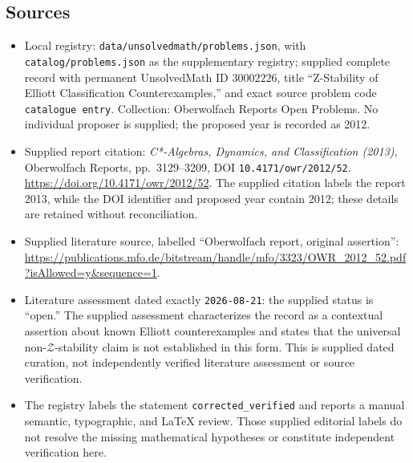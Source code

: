 \documentclass[11pt]{article}
\begin{document}
\subsection{Sources}
\begin{itemize}
\item Local registry: \texttt{data/unsolvedmath/problems.json}, with \texttt{catalog/problems.json} as the supplementary registry; supplied complete record with permanent UnsolvedMath ID \(30002226\), title ``Z-Stability of Elliott Classification Counterexamples,'' and exact source problem code \texttt{catalogue entry}. Collection: Oberwolfach Reports Open Problems. No individual proposer is supplied; the proposed year is recorded as 2012.
\item Supplied report citation: \emph{C*-Algebras, Dynamics, and Classification (2013)}, Oberwolfach Reports, pp.\ 3129--3209, DOI \texttt{10.4171/owr/2012/52}. \url{https://doi.org/10.4171/owr/2012/52}. The supplied citation labels the report 2013, while the DOI identifier and proposed year contain 2012; these details are retained without reconciliation.
\item Supplied literature source, labelled ``Oberwolfach report, original assertion'': \url{https://publications.mfo.de/bitstream/handle/mfo/3323/OWR_2012_52.pdf?isAllowed=y&sequence=1}.
\item Literature assessment dated exactly \texttt{2026-08-21}: the supplied status is ``open.'' The supplied assessment characterizes the record as a contextual assertion about known Elliott counterexamples and states that the universal non-\(\mathcal Z\)-stability claim is not established in this form. This is supplied dated curation, not independently verified literature assessment or source verification.
\item The registry labels the statement \texttt{corrected\_verified} and reports a manual semantic, typographic, and LaTeX review. Those supplied editorial labels do not resolve the missing mathematical hypotheses or constitute independent verification here.
\end{itemize}
\end{document}
